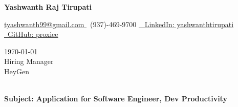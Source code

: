 \documentclass[letterpaper,11pt]{article}
\begin{document}
\begin{center}
    \textbf{\LARGE Yashwanth Raj Tirupati}
    \vspace{4pt}
    
    \small
    \href{mailto:tyashwanth99@gmail.com}{ tyashwanth99@gmail.com }\textbar
     ~(937)-469-9700 \textbar
    \href{https://linkedin.com/in/yashwanthtirupati}{~ LinkedIn: yashwanthtirupati }\textbar 
    \href{https://github.com/proxiee}{~GitHub: proxiee }
\end{center}

\vspace{20pt}

\begin{flushleft}
    \today \\
    \vspace{12pt}
    Hiring Manager \\
    HeyGen \\
    [Location -  Obtain from Job Description if available] \\
\end{flushleft}


\begin{flushleft}
\textbf{Subject: Application for Software Engineer, Dev Productivity}
\end{flushleft}


\end{document}
